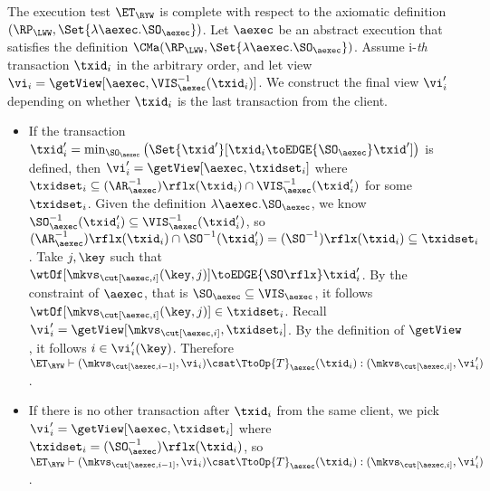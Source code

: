 The execution test $\ET_{\RYW}$ is complete with respect to 
the axiomatic definition $(\RP_{\LWW}, \Set{\lambda \aexec.\SO_{\aexec} })$. 
Let $\aexec$ be an abstract execution that satisfies the definition
$\CMa(\RP_{\LWW}, \Set{\lambda \aexec.\SO_{\aexec} })$.
Assume i-\emph{th} transaction \( \txid_i \) in the arbitrary order,
and let view \( \vi_{i} = \getView[\aexec, \VIS^{-1}_{\aexec}(\txid_{i})] \).
We construct the final view \( \vi'_i\) depending on whether \( \txid_i \) is the last transaction from the client.
\begin{itemize}
\item If the transaction \( \txid'_i = \min_{\SO_\aexec}\left(\Set{\txid'}[\txid_i \toEDGE{\SO_\aexec} \txid'] \right) \)  is defined,
then \( \vi'_i = \getView[\aexec, \txidset_i] \) where \( \txidset_i \subseteq (\AR_{\aexec}^{-1})\rflx(\txid_i) \cap \VIS_\aexec^{-1}(\txid'_i) \) for some \( \txidset_i \).
Given the definition \( \lambda \aexec.\SO_{\aexec} \), 
we know \( \SO_\aexec^{-1}(\txid'_i) \subseteq \VIS_\aexec^{-1}(\txid'_i) \),
so \(  (\AR_\aexec^{-1})\rflx(\txid_i) \cap \SO^{-1}(\txid'_i) = (\SO^{-1})\rflx(\txid_i) \subseteq \txidset_i \).
Take \( j,\key \) such that \( \wtOf[\mkvs_{\cut[\aexec, i]}(\key,j)] \toEDGE{\SO\rflx} \txid'_i\).
By the constraint of \( \aexec \), that is \( \SO_{\aexec} \subseteq \VIS_\aexec \), it follows \( \wtOf[\mkvs_{\cut[\aexec, i]}(\key,j)] \in \txidset_i \).
Recall \( \vi'_i = \getView[\mkvs_{\cut[\aexec, i]}, \txidset_i] \).
By the definition of \( \getView \), it follows \( i \in \vi'_i(\key) \).
Therefore \( \ET_\RYW \vdash (\mkvs_{\cut[\aexec, i-1]}, \vi_i) \csat \TtoOp{T}_{\aexec}(\txid_{i}) : (\mkvs_{\cut[\aexec, i]}, \vi'_{i}) \).

\item If there is no other transaction after \( \txid_i \) from the same client,
we pick \( \vi'_i = \getView[\aexec, \txidset_i] \) where \( \txidset_i = (\SO_\aexec^{-1})\rflx(\txid_i) \),
so \( \ET_\RYW \vdash (\mkvs_{\cut[\aexec, i-1]}, \vi_i) \csat \TtoOp{T}_{\aexec}(\txid_{i}) : (\mkvs_{\cut[\aexec, i]}, \vi'_{i}) \).
\end{itemize}
